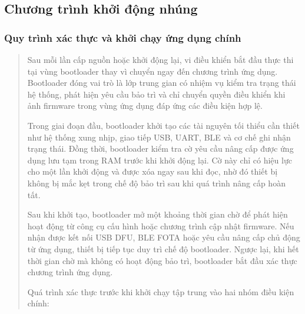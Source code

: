 \documentclass[
  a4paper,
]{report}
\begin{document}
\subsection{Chương trình khởi động nhúng}

\subsubsection{Quy trình xác thực và khởi chạy ứng dụng chính}

\begin{quote}
Sau mỗi lần cấp nguồn hoặc khởi động lại, vi điều khiển bắt đầu thực thi
tại vùng bootloader thay vì chuyển ngay đến chương trình ứng dụng.
Bootloader đóng vai trò là lớp trung gian có nhiệm vụ kiểm tra trạng
thái hệ thống, phát hiện yêu cầu bảo trì và chỉ chuyển quyền điều khiển
khi ảnh firmware trong vùng ứng dụng đáp ứng các điều kiện hợp lệ.

Trong giai đoạn đầu, bootloader khởi tạo các tài nguyên tối thiểu cần
thiết như hệ thống xung nhịp, giao tiếp USB, UART, BLE và cơ chế ghi
nhận trạng thái. Đồng thời, bootloader kiểm tra cờ yêu cầu nâng cấp được
ứng dụng lưu tạm trong RAM trước khi khởi động lại. Cờ này chỉ có hiệu
lực cho một lần khởi động và được xóa ngay sau khi đọc, nhờ đó thiết bị
không bị mắc kẹt trong chế độ bảo trì sau khi quá trình nâng cấp hoàn
tất.

Sau khi khởi tạo, bootloader mở một khoảng thời gian chờ để phát hiện
hoạt động từ công cụ cấu hình hoặc chương trình cập nhật firmware. Nếu
nhận được kết nối USB DFU, BLE FOTA hoặc yêu cầu nâng cấp chủ động từ
ứng dụng, thiết bị tiếp tục duy trì chế độ bootloader. Ngược lại, khi
hết thời gian chờ mà không có hoạt động bảo trì, bootloader bắt đầu xác
thực chương trình ứng dụng.

Quá trình xác thực trước khi khởi chạy tập trung vào hai nhóm điều kiện
chính:
\end{quote}
\end{document}
